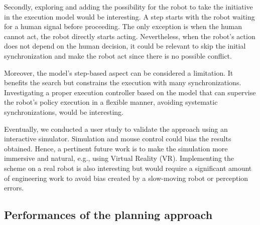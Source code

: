 Secondly, exploring and adding the possibility for the robot to take the initiative in the execution model would be interesting. A step starts with the robot waiting for a human signal before proceeding. The only exception is when the human cannot act, the robot directly starts acting. Nevertheless, when the robot's action does not depend on the human decision, it could be relevant to skip the initial synchronization and make the robot act since there is no possible conflict. 

Moreover, the model's step-based aspect can be considered a limitation. It benefits the search but constrains the execution with many synchronizations. Investigating a proper execution controller based on the model that can supervise the robot's policy execution in a flexible manner, avoiding systematic synchronizations, would be interesting.

Eventually, we conducted a user study to validate the approach using an interactive simulator. Simulation and mouse control could bias the results obtained. Hence, a pertinent future work is to make the simulation more immersive and natural, e.g., using Virtual Reality (VR). Implementing the scheme on a real robot is also interesting but would require a significant amount of engineering work to avoid bias created by a slow-moving robot or perception errors. 

\subsection*{Performances of the planning approach}


